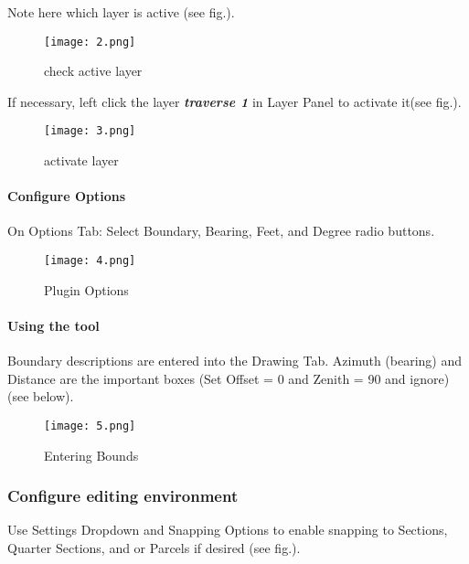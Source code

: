 \large Note here which layer is active (see fig.).
\begin{figure}[H] %
\begin{center}
\texttt{[image: 2.png]}
\end{center}
\caption{check active layer}
\end{figure}


If necessary, left click the layer \textbf {\emph{traverse 1}} in Layer Panel to activate it(see fig.).
\begin{figure}[H] %
\begin{center}
\texttt{[image: 3.png]}
\end{center}
\caption{activate layer}
\end{figure}

\clearpage

\paragraph{Configure Options}
\large On Options Tab: Select Boundary, Bearing, Feet, and Degree radio buttons.
\begin{figure}[H]
\begin{center}
\texttt{[image: 4.png]}
\end{center}
\caption{Plugin Options}
\end{figure}
\clearpage

\paragraph{Using the tool}
\large Boundary descriptions are entered into the Drawing Tab. Azimuth (bearing) and Distance are the important boxes (Set Offset = 0 and Zenith = 90 and ignore)(see below).
\begin{figure}[H]
\begin{center}
\texttt{[image: 5.png]}
\end{center}
\caption{Entering Bounds}
\end{figure}

\clearpage

\subsubsection{Configure editing environment}
\Large Use Settings Dropdown and Snapping Options to enable snapping to Sections, Quarter Sections, and or Parcels if desired (see fig.).

